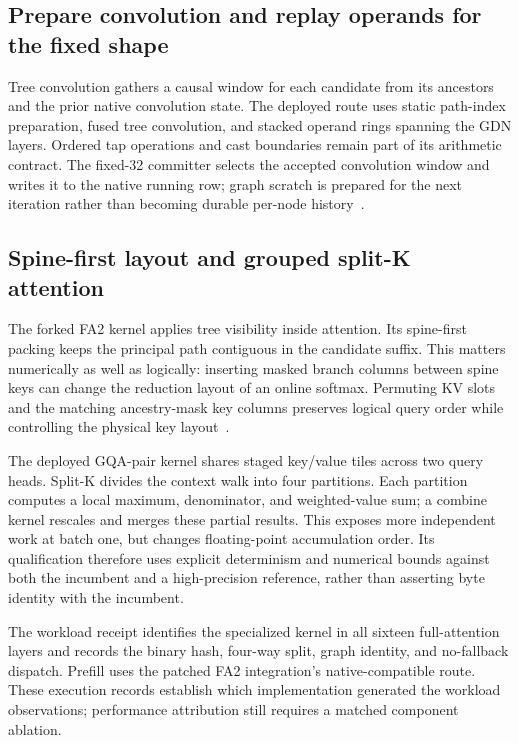 \documentclass[conference]{IEEEtran}
\begin{document}
\subsection{Prepare convolution and replay operands for the fixed shape}
Tree convolution gathers a causal window for each candidate from its ancestors and the prior native convolution state. The deployed route uses static path-index preparation, fused tree convolution, and stacked operand rings spanning the GDN layers. Ordered tap operations and cast boundaries remain part of its arithmetic contract. The fixed-32 committer selects the accepted convolution window and writes it to the native running row; graph scratch is prepared for the next iteration rather than becoming durable per-node history~\cite{lumo2026archive}.

\subsection{Spine-first layout and grouped split-K attention}
\label{sec:reconstruction-numerics}
The forked FA2 kernel applies tree visibility inside attention. Its spine-first packing keeps the principal path contiguous in the candidate suffix. This matters numerically as well as logically: inserting masked branch columns between spine keys can change the reduction layout of an online softmax. Permuting KV slots and the matching ancestry-mask key columns preserves logical query order while controlling the physical key layout~\cite{lumo2026archive}.

The deployed GQA-pair kernel shares staged key/value tiles across two query heads. Split-K divides the context walk into four partitions. Each partition computes a local maximum, denominator, and weighted-value sum; a combine kernel rescales and merges these partial results. This exposes more independent work at batch one, but changes floating-point accumulation order. Its qualification therefore uses explicit determinism and numerical bounds against both the incumbent and a high-precision reference, rather than asserting byte identity with the incumbent.

The workload receipt identifies the specialized kernel in all sixteen full-attention layers and records the binary hash, four-way split, graph identity, and no-fallback dispatch. Prefill uses the patched FA2 integration's native-compatible route. These execution records establish which implementation generated the workload observations; performance attribution still requires a matched component ablation.
\end{document}
